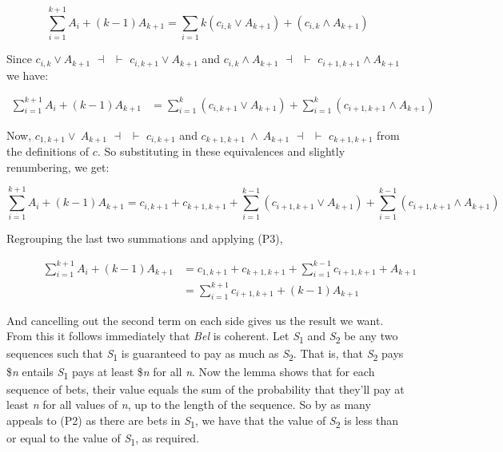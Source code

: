 \documentclass[
  10pt,
  letterpaper,
  DIV=11,
  numbers=noendperiod,
  twoside]{scrartcl}
\begin{document}
\[
\sum_{i=1}^{k+1}A_i + (k-1)A_{k+1} = \sum_{i=1}{k}(c_{i,k} \vee A_{k+1}) + (c_{i,k} \wedge A_{k+1})
\]

Since \(c_{i,k} \vee A_{k+1}\) \(\dashv\)~\(\vdash\)
\(c_{i,k+1} \vee A_{k+1}\) and \(c_{i,k} \wedge A_{k+1}\)
\(\dashv\)~\(\vdash\) \(c_{i+1,k+1} \wedge A_{k+1}\) we have:

\[
\begin{aligned}
\sum_{i=1}^{k+1}A_i + (k-1)A_{k+1} &= \sum_{i=1}^{k}(c_{i,k+1} \vee A_{k+1}) + \sum_{i=1}^{k}(c_{i+1,k+1} \wedge A_{k+1})
\end{aligned}
\]

Now, \(c_{1,k+1} \vee~ A_{k+1}\) \(\dashv\)~\(\vdash\) \(c_{i,k+1}\) and
\(c_{k+1,k+1} ~\wedge~ A_{k+1}\) \(\dashv\)~\(\vdash\) \(c_{k+1,k+1}\)
from the definitions of \(c\). So substituting in these equivalences and
slightly renumbering, we get:

\[
\sum_{i=1}^{k+1}A_i + (k-1)A_{k+1} = c_{i,k+1} +c_{k+1,k+1} + \sum_{i=1}^{k-1}(c_{i+1,k+1} \vee A_{k+1}) + \sum_{i=1}^{k-1}(c_{i+1,k+1} \wedge A_{k+1})
\]

Regrouping the last two summations and applying (P3),

\begin{figure}

\[
\begin{aligned}
\sum_{i=1}^{k+1}A_i + (k-1)A_{k+1} &= c_{1,k+1} + c_{k+1,k+1} + \sum_{i=1}^{k-1}c_{i+1,k+1} + A_{k+1} \\
&= \sum_{i=1}^{k+1}c_{i+1,k+1} + (k-1)A_{k+1}
\end{aligned}
\]

\end{figure}%

And cancelling out the second term on each side gives us the result we
want. From this it follows immediately that \emph{Bel} is coherent. Let
\emph{S}\textsubscript{1} and \emph{S}\textsubscript{2} be any two
sequences such that \emph{S}\textsubscript{1} is guaranteed to pay as
much as \emph{S}\textsubscript{2}. That is, that
\emph{S}\textsubscript{2} pays \$\emph{n} entails
\emph{S}\textsubscript{1} pays at least \$\emph{n} for all \emph{n}. Now
the lemma shows that for each sequence of bets, their value equals the
sum of the probability that they'll pay at least \emph{n} for all values
of \emph{n}, up to the length of the sequence. So by as many appeals to
(P2) as there are bets in \emph{S}\textsubscript{1}, we have that the
value of \emph{S}\textsubscript{2} is less than or equal to the value of
\emph{S}\textsubscript{1}, as required.
\end{document}
